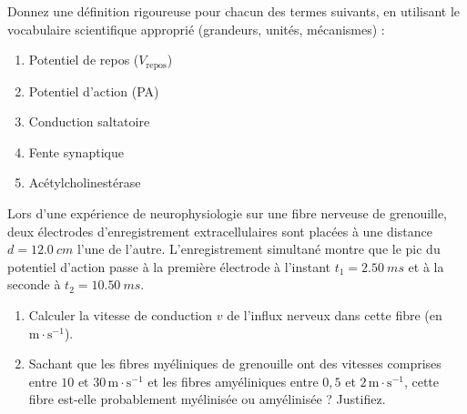 \documentclass[11pt]{article}
\newcounter{popsec}
\newcounter{popsub}
\newcommand{\courssub}[1]{%
  \stepcounter{popsub}%
  \par\vspace{9pt}\noindent{\popxbold\fontsize{11.5}{13}\selectfont\color{popink}{\color{poporange}\thepopsec.\thepopsub}\hspace{6pt}#1}\par\nopagebreak\vspace{4pt}
}
\begin{document}
\begin{exercice}
Donnez une définition rigoureuse pour chacun des termes suivants, en utilisant le vocabulaire scientifique approprié (grandeurs, unités, mécanismes) :
\begin{enumerate}
    \item Potentiel de repos ($V_{\text{repos}}$)
    \item Potentiel d'action (PA)
    \item Conduction saltatoire
    \item Fente synaptique
    \item Acétylcholinestérase
\end{enumerate}
\end{exercice}

\begin{exercice}
Lors d'une expérience de neurophysiologie sur une fibre nerveuse de grenouille, deux électrodes d'enregistrement extracellulaires sont placées à une distance $d = \SI{12,0}{cm}$ l'une de l'autre. L'enregistrement simultané montre que le pic du potentiel d'action passe à la première électrode à l'instant $t_1 = \SI{2,50}{ms}$ et à la seconde à $t_2 = \SI{10,50}{ms}$.
\begin{enumerate}
    \item Calculer la vitesse de conduction $v$ de l'influx nerveux dans cette fibre (en $\text{m}\cdot\text{s}^{-1}$).
    \item Sachant que les fibres myéliniques de grenouille ont des vitesses comprises entre $10$ et $30\,\text{m}\cdot\text{s}^{-1}$ et les fibres amyéliniques entre $0,5$ et $2\,\text{m}\cdot\text{s}^{-1}$, cette fibre est-elle probablement myélinisée ou amyélinisée ? Justifiez.
\end{enumerate}
\end{exercice}

\courssub{Je m'entraîne}
\end{document}
